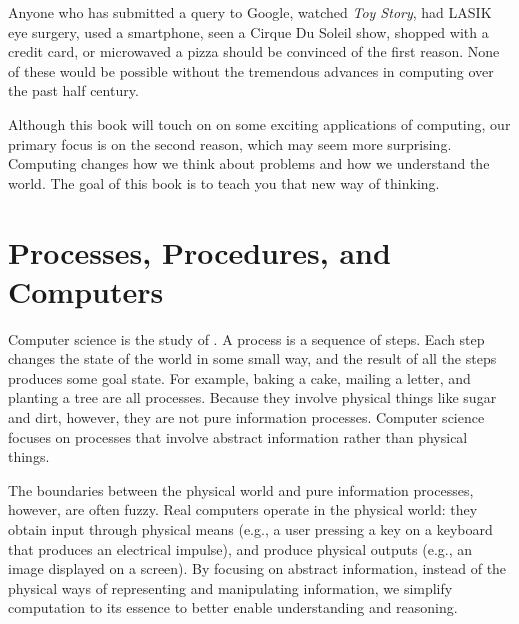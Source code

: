 Anyone who has submitted a query to Google, watched \emph{Toy Story}, had LASIK eye surgery, used a smartphone, seen a Cirque Du Soleil show, shopped with a credit card, or microwaved a pizza should be convinced of the first reason.  None of these would be possible without the tremendous advances in computing over the past half century. 

Although this book will touch on on some exciting applications of computing, our primary focus is on the second reason, which may seem more surprising.  Computing changes how we think about problems and how we understand the world.  The goal of this book is to teach you that new way of thinking.

\section{Processes, Procedures, and Computers}\label{sec:processes}

Computer science is the study of .  A process is a sequence of steps.  Each step changes the state of the world in some small way, and the result of all the steps produces some goal state. For example, baking a cake, mailing a letter, and planting a tree are all processes.  Because they involve physical things like sugar and dirt, however, they are not pure information processes.  Computer science focuses on processes that involve abstract information rather than physical things.  


The boundaries between the physical world and pure information processes, however, are often fuzzy.  Real computers operate in the physical world: they obtain input through physical means (e.g., a user pressing a key on a keyboard that produces an electrical impulse), and produce physical outputs (e.g., an image displayed on a screen).  By focusing on abstract information, instead of the physical ways of representing and manipulating information, we simplify computation to its essence to better enable understanding and reasoning.



